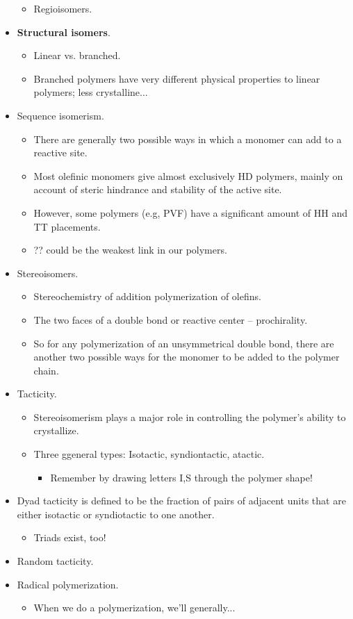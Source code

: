 \documentclass[../notes.tex]{subfiles}
\begin{document}
\begin{itemize}
\begin{itemize}
        \item Regioisomers.
    \end{itemize}
    \item \textbf{Structural isomers}.
    \begin{itemize}
        \item Linear vs. branched.
        \item Branched polymers have very different physical properties to linear polymers; less crystalline...
    \end{itemize}
    \item Sequence isomerism.
    \begin{itemize}
        \item There are generally two possible ways in which a monomer can add to a reactive site.
        \item Most olefinic monomers give almost exclusively HD polymers, mainly on account of steric hindrance and stability of the active site.
        \item However, some polymers (e.g, PVF) have a significant amount of HH and TT placements.
        \item ?? could be the weakest link in our polymers.
    \end{itemize}
    \item Stereoisomers.
    \begin{itemize}
        \item Stereochemistry of addition polymerization of olefins.
        \item The two faces of a double bond or reactive center -- prochirality.
        \item So for any polymerization of an unsymmetrical double bond, there are another two possible ways for the monomer to be added to the polymer chain.
    \end{itemize}
    \item Tacticity.
    \begin{itemize}
        \item Stereoisomerism plays a major role in controlling the polymer's ability to crystallize.
        \item Three ggeneral types: Isotactic, syndiontactic, atactic.
        \begin{itemize}
            \item Remember by drawing letters I,S through the polymer shape!
        \end{itemize}
    \end{itemize}
    \item Dyad tacticity is defined to be the fraction of pairs of adjacent units that are either isotactic or syndiotactic to one another.
    \begin{itemize}
        \item Triads exist, too!
    \end{itemize}
    \item Random tacticity.
    \item Radical polymerization.
    \begin{itemize}
        \item When we do a polymerization, we'll generally...
    \end{itemize}
\end{itemize}
\end{document}
